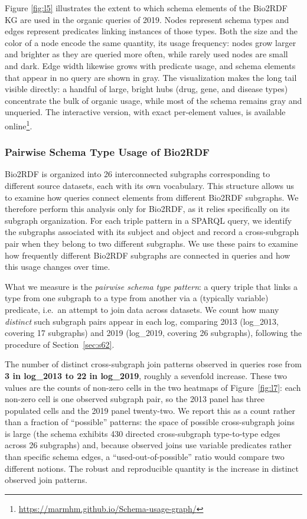 \documentclass[sw]{iosart2x}
\begin{document}
Figure \ref{fig:l5} illustrates the extent to which schema elements of the Bio2RDF KG are used in the organic queries of 2019. Nodes represent schema types and edges represent predicates linking instances of those types. Both the size and the color of a node encode the same quantity, its usage frequency: nodes grow larger and brighter as they are queried more often, while rarely used nodes are small and dark. Edge width likewise grows with predicate usage, and schema elements that appear in no query are shown in gray. The visualization makes the long tail visible directly: a handful of large, bright hubs (drug, gene, and disease types) concentrate the bulk of organic usage, while most of the schema remains gray and unqueried. The interactive version, with exact per-element values, is available online\footnote{\url{https://marmhm.github.io/Schema-usage-graph/}}.


\subsubsection{Pairwise Schema Type Usage of Bio2RDF}\label{sec:pairwise}

Bio2RDF is organized into 26 interconnected subgraphs corresponding to different source datasets, each with its own vocabulary. This structure allows us to examine how queries connect elements from different Bio2RDF subgraphs. We therefore perform this analysis only for Bio2RDF, as it relies specifically on its subgraph organization. For each triple pattern in a SPARQL query, we identify the subgraphs associated with its subject and object and record a cross-subgraph pair when they belong to two different subgraphs. We use these pairs to examine how frequently different Bio2RDF subgraphs are connected in queries and how this usage changes over time.

What we measure is the \emph{pairwise schema type pattern}: a query triple that links a type from one subgraph to a type from another via a (typically variable) predicate, i.e.\ an attempt to join data across datasets. We count how many \emph{distinct} such subgraph pairs appear in each log, comparing 2013 (log\_2013, covering 17 subgraphs) and 2019 (log\_2019, covering 26 subgraphs), following the procedure of Section~\ref{sec:s62}.

The number of distinct cross-subgraph join patterns observed in queries rose from \textbf{3 in log\_2013 to 22 in log\_2019}, roughly a sevenfold increase. These two values are the counts of non-zero cells in the two heatmaps of Figure~\ref{fig:l7}: each non-zero cell is one observed subgraph pair, so the 2013 panel has three populated cells and the 2019 panel twenty-two. We report this as a count rather than a fraction of ``possible'' patterns: the space of possible cross-subgraph joins is large (the schema exhibits 430 directed cross-subgraph type-to-type edges across 26 subgraphs) and, because observed joins use variable predicates rather than specific schema edges, a ``used-out-of-possible'' ratio would compare two different notions. The robust and reproducible quantity is the increase in distinct observed join patterns.
\end{document}
